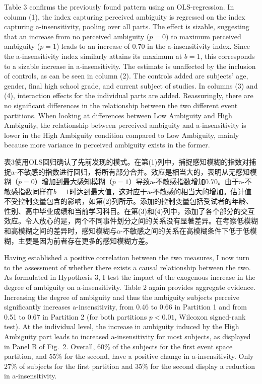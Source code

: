 \documentclass[12pt,a4paper]{article}
\newenvironment{original}
  {\par\medskip\noindent\color{black}\ignorespaces}
  {\par\medskip}
\newenvironment{translation}
  {\par\noindent\color{transblue}\ignorespaces}
  {\par\medskip\medskip}
\begin{document}
\begin{original}
Table 3 confirms the previously found pattern using an OLS-regression. In column (1), the index capturing perceived ambiguity is regressed on the index capturing a-insensitivity, pooling over all parts. The effect is sizable, suggesting that an increase from no perceived ambiguity ($\bar{p} = 0$) to maximum perceived ambiguity ($\bar{p} = 1$) leads to an increase of 0.70 in the a-insensitivity index. Since the a-insensitivity index similarly attains its maximum at $b = 1$, this corresponds to a sizable increase in a-insensitivity. The estimate is unaffected by the inclusion of controls, as can be seen in column (2). The controls added are subjects' age, gender, final high school grade, and current subject of studies. In columns (3) and (4), interaction effects for the individual parts are added. Reassuringly, there are no significant differences in the relationship between the two different event partitions. When looking at differences between Low Ambiguity and High Ambiguity, the relationship between perceived ambiguity and a-insensitivity is lower in the High Ambiguity condition compared to Low Ambiguity, mainly because more variance in perceived ambiguity exists in the former.
\end{original}

\begin{translation}
表3使用OLS回归确认了先前发现的模式。在第(1)列中，捕捉感知模糊的指数对捕捉a-不敏感的指数进行回归，将所有部分合并。效应是相当大的，表明从无感知模糊（$\bar{p} = 0$）增加到最大感知模糊（$\bar{p} = 1$）导致a-不敏感指数增加0.70。由于a-不敏感指数同样在$b = 1$时达到最大值，这对应于a-不敏感的相当大的增加。估计值不受控制变量包含的影响，如第(2)列所示。添加的控制变量包括受试者的年龄、性别、高中毕业成绩和当前学习科目。在第(3)和(4)列中，添加了各个部分的交互效应。令人放心的是，两个不同事件划分之间的关系没有显著差异。在考察低模糊和高模糊之间的差异时，感知模糊与a-不敏感之间的关系在高模糊条件下低于低模糊，主要是因为前者存在更多的感知模糊方差。
\end{translation}

\begin{original}
Having established a positive correlation between the two measures, I now turn to the assessment of whether there exists a causal relationship between the two. As formulated in Hypothesis 3, I test the impact of the exogenous increase in the degree of ambiguity on a-insensitivity. Table 2 again provides aggregate evidence. Increasing the degree of ambiguity and thus the ambiguity subjects perceive significantly increases a-insensitivity, from 0.46 to 0.66 in Partition 1 and from 0.51 to 0.67 in Partition 2 (for both partitions $p < 0.01$, Wilcoxon signed-rank test). At the individual level, the increase in ambiguity induced by the High Ambiguity part leads to increased a-insensitivity for most subjects, as displayed in Panel B of Fig.\ 2. Overall, 60\% of the subjects for the first event space partition, and 55\% for the second, have a positive change in a-insensitivity. Only 27\% of subjects for the first partition and 35\% for the second display a reduction in a-insensitivity.
\end{original}
\end{document}
